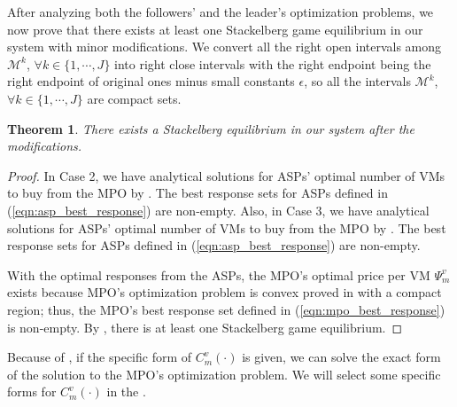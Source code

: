 \documentclass[10pt,journal, compsoc]{IEEEtran}
\newtheorem{theorem}{Theorem}
\begin{document}
After analyzing both the followers' and the leader's optimization problems, we now prove that there exists at least one Stackelberg game equilibrium in our system with minor modifications. We convert all the right open intervals among $\mathcal{M}^k$, $\forall k \in \{1, \cdots, J\}$ into right close intervals with the right endpoint being the right endpoint of original ones minus small constants $\epsilon$, so all the intervals $\mathcal{M}^k$, $\forall k \in \{1, \cdots, J\}$ are compact sets. 
\begin{theorem} \label{thm:stackelberg_game_equilibrium}
There exists a Stackelberg equilibrium in our system after the modifications.
\end{theorem}
\begin{proof}
In Case 2, we have analytical solutions for ASPs' optimal number of VMs to buy from the MPO by . The best response sets for ASPs defined in (\ref{eqn:asp_best_response}) are non-empty. Also, in Case 3, we have analytical solutions for ASPs' optimal number of VMs to buy from the MPO by . The best response sets for ASPs defined in (\ref{eqn:asp_best_response}) are non-empty. 

With the optimal responses from the ASPs, the MPO's optimal price per VM $\Psi_m^v$ exists because MPO's optimization problem is convex proved in  with a compact region; thus, the MPO's best response set defined in (\ref{eqn:mpo_best_response}) is non-empty. By , there is at least one Stackelberg game equilibrium.
\end{proof}
Because of , if the specific form of $C_m^v(\cdot)$ is given, we can solve the exact form of the solution to the MPO's optimization problem. We will select some specific forms for $C_m^v(\cdot)$ in the .
\end{document}

